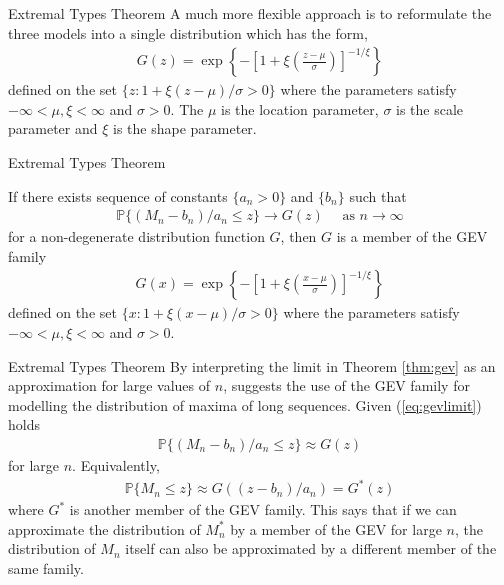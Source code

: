 \documentclass[10pt]{beamer}
\begin{document}
\begin{frame}{Extremal Types Theorem}
A much more flexible approach is to reformulate the three models into a single distribution which has the form,
\begin{align}\label{eq:gev}
G(z) = \exp \left\{-\left[1+\xi\left(\frac{z-\mu}{\sigma}\right)\right]^{-1/\xi}\right\}
\end{align}
defined on the set $\{z : 1 + \xi(z-\mu)/\sigma>0\}$ where the parameters satisfy $-\infty<\mu, \xi<\infty$ and $\sigma >0$. The $\mu$ is the location parameter, $\sigma$ is the scale parameter and $\xi$ is the shape parameter.

\end{frame}

\begin{frame}{Extremal Types Theorem}
\begin{theorem}\label{thm:gev}
If there exists sequence of constants $\{a_n>0\}$ and $\{b_n\}$ such that 
\begin{align}\label{eq:gevlimit}
\mathbb{P}\{(M_n - b_n)/a_n\leq z\} \to G(z) \quad\text{ as } n \to \infty
\end{align}
for a non-degenerate distribution function $G$, then $G$ is a member of the GEV family
\begin{align}
G(x) = \exp \left\{-\left[1+\xi\left(\frac{x-\mu}{\sigma}\right)\right]^{-1/\xi}\right\}
\end{align}
defined on the set $\{x : 1 + \xi(x-\mu)/\sigma>0\}$ where the parameters satisfy $-\infty<\mu, \xi<\infty$ and $\sigma >0$.
\end{theorem}
\end{frame}

\begin{frame}{Extremal Types Theorem}
By interpreting the limit in Theorem \ref{thm:gev} as an approximation for large values of $n$, suggests the use of the GEV family for modelling the distribution of maxima of long sequences. %
Given (\ref{eq:gevlimit}) holds
\begin{align*}
\mathbb{P}\{(M_n-b_n)/a_n\leq z\} \approx G(z)
\end{align*}
for large $n$. Equivalently,
\begin{align*}
\mathbb{P}\{M_n\leq z\} \approx G((z-b_n)/a_n) = G^\ast(z)
\end{align*}
where $G^\ast$ is another member of the GEV family. This says that if we can approximate the distribution of $M_n^\ast$ by a member of the GEV for large $n$, the distribution of $M_n$ itself can also be approximated by a different member of the same family.
\end{frame}
\end{document}
